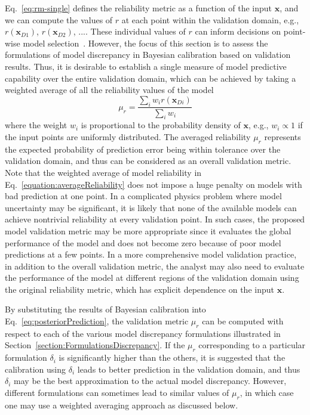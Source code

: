 \documentclass[preprint,review,12pt,3p]{elsarticle}
\begin{document}
Eq.~\ref{eq:rm-single} defines the reliability metric as a function of the input $\boldsymbol{x}$, and we can compute the values of $r$ at each point within the validation domain, e.g., $r(\boldsymbol{x}_{D1})$, $r(\boldsymbol{x}_{D2})$, .... These individual values of $r$ can inform decisions on point-wise model selection~\citep{Hombal2013}. However, the focus of this section is to assess the formulations of model discrepancy in Bayesian calibration based on validation results. Thus, it is desirable to establish a single measure of model predictive capability over the entire validation domain, which can be achieved by taking a weighted average of all the reliability values of the model
\begin{equation}\label{equation:averageReliability}
\mu_r = \frac{\sum_{i} w_i r(\boldsymbol{x}_{Di})}{\sum_{i} w_i}
\end{equation} 
where the weight $w_i$ is proportional to the probability density of $\boldsymbol{x}$, e.g., $w_i \propto 1$ if the input points are uniformly distributed. The averaged reliability $\mu_r$ represents the expected probability of prediction error being within tolerance over the validation domain, and thus can be considered as an overall validation metric. Note that the weighted average of model reliability in Eq.~\ref{equation:averageReliability} does not impose a huge penalty on models with bad prediction at one point. In a complicated physics problem where model uncertainty may be significant, it is likely that none of the available models can achieve nontrivial reliability at every validation point. In such cases, the proposed model validation metric may be more appropriate since it evaluates the global performance of the model and does not become zero because of poor model predictions at a few points. In a more comprehensive model validation practice, in addition to the overall validation metric, the analyst may also need to evaluate the performance of the model at different regions of the validation domain using the original reliability metric, which has explicit dependence on the input $\boldsymbol{x}$.

By substituting the results of Bayesian calibration into Eq.~\ref{eq:posteriorPrediction}, the validation metric $\mu_r$ can be computed with respect to each of the various model discrepancy formulations illustrated in Section~\ref{section:FormulationsDiscrepancy}. If the $\mu_r$ corresponding to a particular formulation $\delta_i$ is significantly higher than the others, it is suggested that the calibration using $\delta_i$ leads to better prediction in the validation domain, and thus $\delta_i$ may be the best approximation to the actual model discrepancy. However, different formulations can sometimes lead to similar values of $\mu_r$, in which case one may use a weighted averaging approach as discussed below.
\end{document}
